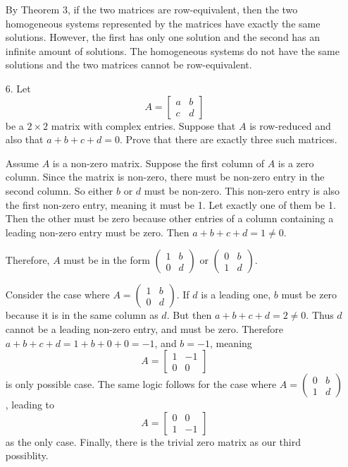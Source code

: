 \documentclass{article}
\begin{document}
\begin{enumerate}[listparindent=\parindent]
By Theorem 3, if the two matrices are row-equivalent,
then the two homogeneous systems represented by the matrices have exactly the same solutions.
However, the first has only one solution and the second has an infinite amount of solutions.
The homogeneous systems do not have the same solutions and the two matrices cannot be row-equivalent.

\item[6.] Let
    \[
        A = \begin{bmatrix}
            a & b \\ c & d
        \end{bmatrix}
    \]
    be a \(2 \times 2\) matrix with complex entries. Suppose that \(A\) is row-reduced and also that \(a + b + c + d = 0\).
    Prove that there are exactly three such matrices.

Assume \(A\) is a non-zero matrix.
Suppose the first column of \(A\) is a zero column.
Since the matrix is non-zero, there must be non-zero entry in the second column. So either \(b\) or \(d\) must be non-zero.
This non-zero entry is also the first non-zero entry, meaning it must be 1. Let exactly one of them be 1.
Then the other must be zero because other entries of a column containing a leading non-zero entry must be zero.
Then \(a + b + c + d = 1 \neq 0\).

Therefore, \(A\) must be in the form \( (\begin{smallmatrix} 1 & b \\ 0 & d \end{smallmatrix}) \)
or \( (\begin{smallmatrix} 0 & b \\ 1 & d \end{smallmatrix}) \).

Consider the case where \(A = (\begin{smallmatrix} 1 & b \\ 0 & d\end{smallmatrix}) \).
If \(d\) is a leading one, \(b\) must be zero because it is in the same column as \(d\).
But then \(a + b + c + d = 2 \neq 0\).
Thus \(d\) cannot be a leading non-zero entry, and must be zero.
Therefore \(a + b + c + d = 1 + b + 0 + 0 = -1\), and \(b = -1\), meaning
\[
    A = \begin{bmatrix}
        1 & -1 \\ 0 & 0
    \end{bmatrix}
\]
is only possible case. The same logic follows for the case where \(A = (\begin{smallmatrix} 0 & b \\ 1 & d\end{smallmatrix}) \),
leading to
\[
    A = \begin{bmatrix}
        0 & 0 \\ 1 & -1
    \end{bmatrix}
\]
as the only case. Finally, there is the trivial zero matrix as our third possiblity.


\end{enumerate}
\end{document}
